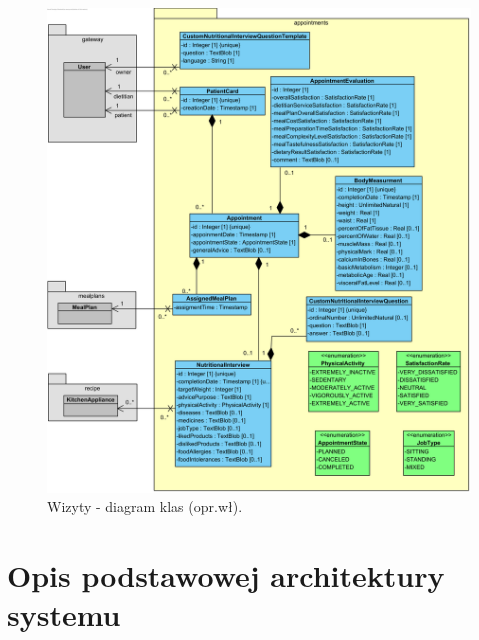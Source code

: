 \begin{minipage}{\textwidth}
    \begin{figure}[H]
        \centering\includegraphics[scale=0.7]{../uml/class_diagrams/appointments.png}
        \caption{Wizyty - diagram klas (opr.wł).}\label{rysunek:class-diagram-appointments}
    \end{figure}
\end{minipage}

\section{Opis podstawowej architektury systemu}\label{sec:basicArchitecture}

\thispagestyle{normal}
